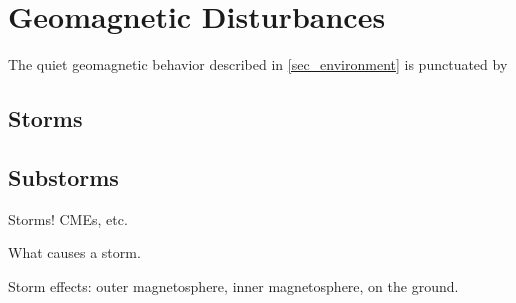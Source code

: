 \section{Geomagnetic Disturbances}
  \label{sec_storms}

The quiet geomagnetic behavior described in \cref{sec_environment} is punctuated by 







\subsection{Storms}

\subsection{Substorms}

Storms! CMEs, etc. 


What causes a storm. 

Storm effects: outer magnetosphere, inner magnetosphere, on the ground.








